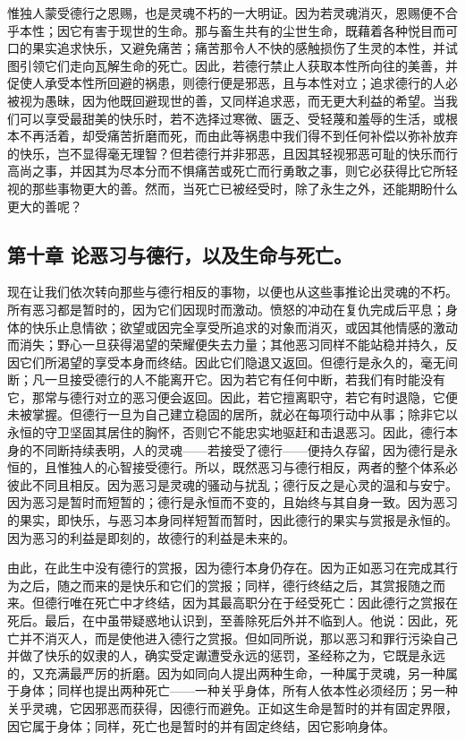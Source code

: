 惟独人蒙受德行之恩赐，也是灵魂不朽的一大明证。因为若灵魂消灭，恩赐便不合乎本性；因它有害于现世的生命。那与畜生共有的尘世生命，既藉着各种悦目而可口的果实追求快乐，又避免痛苦；痛苦那令人不快的感触损伤了生灵的本性，并试图引领它们走向瓦解生命的死亡。因此，若德行禁止人获取本性所向往的美善，并促使人承受本性所回避的祸患，则德行便是邪恶，且与本性对立；追求德行的人必被视为愚昧，因为他既回避现世的善，又同样追求恶，而无更大利益的希望。当我们可以享受最甜美的快乐时，若不选择过寒微、匮乏、受轻蔑和羞辱的生活，或根本不再活着，却受痛苦折磨而死，而由此等祸患中我们得不到任何补偿以弥补放弃的快乐，岂不显得毫无理智？但若德行并非邪恶，且因其轻视邪恶可耻的快乐而行高尚之事，并因其为尽本分而不惧痛苦或死亡而行勇敢之事，则它必获得比它所轻视的那些事物更大的善。然而，当死亡已被经受时，除了永生之外，还能期盼什么更大的善呢？\par


\subsection{第十章 论恶习与德行，以及生命与死亡。}

现在让我们依次转向那些与德行相反的事物，以便也从这些事推论出灵魂的不朽。所有恶习都是暂时的，因为它们因现时而激动。愤怒的冲动在复仇完成后平息；身体的快乐止息情欲；欲望或因完全享受所追求的对象而消灭，或因其他情感的激动而消失；野心一旦获得渴望的荣耀便失去力量；其他恶习同样不能站稳并持久，反因它们所渴望的享受本身而终结。因此它们隐退又返回。但德行是永久的，毫无间断；凡一旦接受德行的人不能离开它。因为若它有任何中断，若我们有时能没有它，那常与德行对立的恶习便会返回。因此，若它擅离职守，若它有时退隐，它便未被掌握。但德行一旦为自己建立稳固的居所，就必在每项行动中从事；除非它以永恒的守卫坚固其居住的胸怀，否则它不能忠实地驱赶和击退恶习。因此，德行本身的不同断持续表明，人的灵魂——若接受了德行——便持久存留，因为德行是永恒的，且惟独人的心智接受德行。所以，既然恶习与德行相反，两者的整个体系必彼此不同且相反。因为恶习是灵魂的骚动与扰乱；德行反之是心灵的温和与安宁。因为恶习是暂时而短暂的；德行是永恒而不变的，且始终与其自身一致。因为恶习的果实，即快乐，与恶习本身同样短暂而暂时，因此德行的果实与赏报是永恒的。因为恶习的利益是即刻的，故德行的利益是未来的。\par

由此，在此生中没有德行的赏报，因为德行本身仍存在。因为正如恶习在完成其行为之后，随之而来的是快乐和它们的赏报；同样，德行终结之后，其赏报随之而来。但德行唯在死亡中才终结，因为其最高职分在于经受死亡：因此德行之赏报在死后。最后，在中虽带疑惑地认识到，至善除死后外并不临到人。他说：因此，死亡并不消灭人，而是使他进入德行之赏报。但如同所说，那以恶习和罪行污染自己并做了快乐的奴隶的人，确实受定谳遭受永远的惩罚，圣经称之为，它既是永远的，又充满最严厉的折磨。因为如同向人提出两种生命，一种属于灵魂，另一种属于身体；同样也提出两种死亡——一种关乎身体，所有人依本性必须经历；另一种关乎灵魂，它因邪恶而获得，因德行而避免。正如这生命是暂时的并有固定界限，因它属于身体；同样，死亡也是暂时的并有固定终结，因它影响身体。\par

